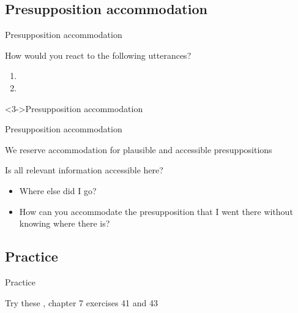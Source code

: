 \documentclass{beamer}
\newcommand{\subonefour}{Presupposition accommodation}
\newcommand{\subonefive}{Practice}
\begin{document}
    \subsection{\subonefour}
      \begin{frame}{\subonefour}
        \begin{block}{How would you react to the following utterances?}
          \begin{enumerate}
            \item {}
            \item {}
          \end{enumerate}
        \end{block}
        \begin{alertblock}<3->{Presupposition accommodation}
          
        \end{alertblock}
      \end{frame}

      \begin{frame}{\subonefour}
        \begin{block}{}
          We reserve accommodation for plausible and accessible presuppositions
        \end{block}
        \begin{block}{Is all relevant information accessible here?}
          \begin{itemize}
            \item<2-> Where else did I go?
            \item<2-> How can you accommodate the presupposition that I went there without knowing where there is?
          \end{itemize}
        \end{block}
      \end{frame}

    \subsection{\subonefive}
      \begin{frame}{\subonefive}
        \begin{block}{Try these}
          \textcite{dawson_language_2016}, chapter 7 exercises 41 and 43
        \end{block}
      \end{frame}
\end{document}
